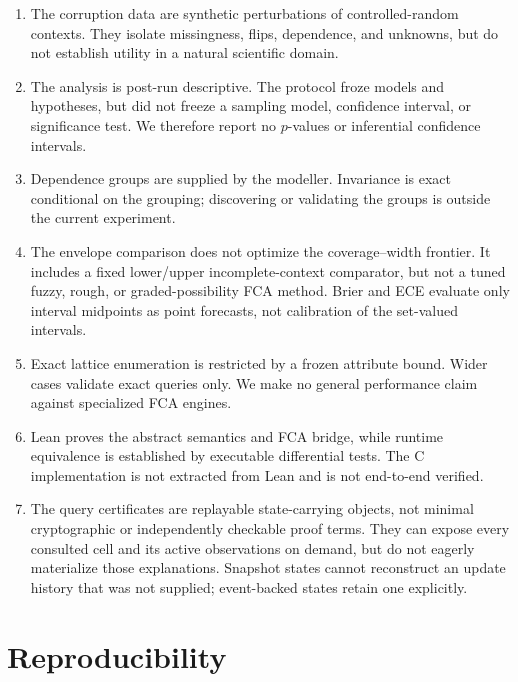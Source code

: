 \documentclass[11pt]{article}
\begin{document}
\begin{enumerate}
  \item The corruption data are synthetic perturbations of controlled-random
        contexts. They isolate missingness, flips, dependence, and unknowns,
        but do not establish utility in a natural scientific domain.
  \item The analysis is post-run descriptive. The protocol froze models and
        hypotheses, but did not freeze a sampling model, confidence interval,
        or significance test. We therefore report no $p$-values or inferential
        confidence intervals.
  \item Dependence groups are supplied by the modeller. Invariance is exact
        conditional on the grouping; discovering or validating the groups is
        outside the current experiment.
  \item The envelope comparison does not optimize the coverage--width frontier.
        It includes a fixed lower/upper incomplete-context comparator, but not
        a tuned fuzzy, rough, or graded-possibility FCA method. Brier and ECE
        evaluate only interval midpoints as point forecasts, not calibration
        of the set-valued intervals.
  \item Exact lattice enumeration is restricted by a frozen attribute bound.
        Wider cases validate exact queries only. We make no general
        performance claim against specialized FCA engines.
  \item Lean proves the abstract semantics and FCA bridge, while runtime
        equivalence is established by executable differential tests. The C
        implementation is not extracted from Lean and is not end-to-end
        verified.
  \item The query certificates are replayable state-carrying objects, not
        minimal cryptographic or independently checkable proof terms. They can
        expose every consulted cell and its active observations on demand, but
        do not eagerly materialize those explanations. Snapshot states cannot
        reconstruct an update history that was not supplied; event-backed
        states retain one explicitly.
\end{enumerate}

\section{Reproducibility}
\label{sec:reproducibility}
\end{document}
